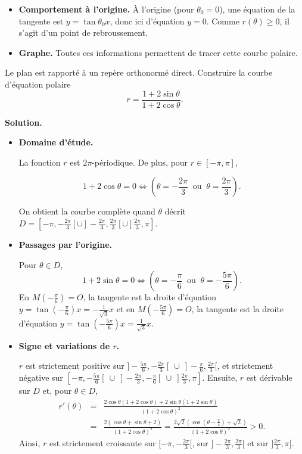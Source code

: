 \documentclass[class=report,crop=false]{standalone}
\begin{document}
\begin{exemple}
\begin{itemize}
  \item \textbf{Comportement à l'origine.} À l'origine
  (pour $\theta_0=0$), une équation de la tangente est $y=\tan \theta_0 x$,
  donc ici d'équation $y=0$. Comme $r(\theta)\ge0$,
  il s'agit d'un point de rebroussement.

  \item \textbf{Graphe.} Toutes ces informations permettent de tracer cette courbe polaire.

\end{itemize}




\end{exemple}



\begin{exemple}
Le plan est rapporté à un repère orthonormé direct.
Construire la courbe d'équation polaire
$$r=\frac{1+2\sin\theta}{1+2\cos\theta}.$$

\medskip
\textbf{Solution.}

\begin{itemize}
  \item \textbf{Domaine d'étude.}

La fonction $r$ est $2\pi$-périodique. De plus, pour $r\in[-\pi,\pi]$,

$$1+2\cos\theta=0 \iff \left(\theta=-\frac{2\pi}{3}\ \text{ ou }\ \theta=\frac{2\pi}{3}\right).$$

On obtient la courbe complète quand $\theta$ décrit
$D=[-\pi,-\frac{2\pi}{3}[ \cup ]-\frac{2\pi}{3},\frac{2\pi}{3}[ \cup ]\frac{2\pi}{3},\pi]$.

  \item \textbf{Passages par l'origine.}

Pour $\theta\in D$,
$$1+2\sin\theta=0\iff \left(\theta=-\frac{\pi}{6}\ \text{ ou }\ \theta=-\frac{5\pi}{6}\right).$$
En $M(-\frac{\pi}{6})=O$, la tangente est la
droite d'équation $y=\tan(-\frac{\pi}{6})x=-\frac{1}{\sqrt{3}}x$
et en $M(-\frac{5\pi}{6})=O$, la tangente est la droite d'équation
$y=\tan(-\frac{5\pi}{6})x=\frac{1}{\sqrt{3}}x$.

  \item \textbf{Signe et variations de $r$.}

  $r$ est strictement positive sur $]-\frac{5\pi}{6},-\frac{2\pi}{3}[ \  \cup  \ ]-\frac{\pi}{6},\frac{2\pi}{3}[$,
  et strictement négative sur
  $[-\pi,-\frac{5\pi}{6}[ \  \cup \  ]-\frac{2\pi}{3},-\frac{\pi}{6}[ \  \cup  \ ]\frac{2\pi}{3},\pi]$.
Ensuite, $r$ est dérivable sur $D$ et, pour $\theta\in D$,
\begin{eqnarray*}
r'(\theta)
&=&\frac{2\cos\theta(1+2\cos\theta)+2\sin\theta(1+2\sin\theta)}{(1+2\cos\theta)^2}\\
&=&\frac{2(\cos\theta+\sin\theta+2)}{(1+2\cos\theta)^2}
=\frac{2\sqrt{2}(\cos(\theta-\frac{\pi}{4})+\sqrt{2})}{(1+2\cos\theta)^2}>0.
\end{eqnarray*}
Ainsi, $r$ est strictement croissante sur $[-\pi,-\frac{2\pi}{3}[$,
sur $]-\frac{2\pi}{3},\frac{2\pi}{3}[$ et sur $]\frac{2\pi}{3},\pi]$.


\end{itemize}
\end{exemple}
\end{document}
